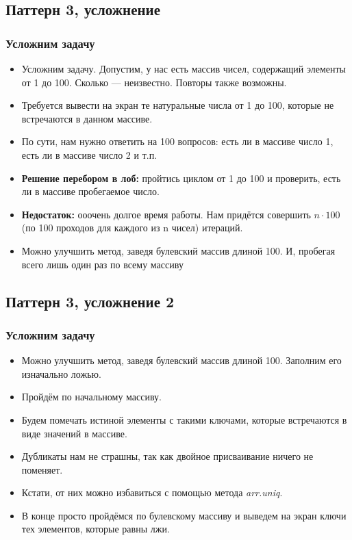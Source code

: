 \documentclass[compress,red]{beamer}
\begin{document}
\subsection{Паттерн 3, усложнение}
\begin{frame}[fragile]
\frametitle{Усложним задачу}
		\begin{itemize}
			\item Усложним задачу. Допустим, у нас есть массив чисел, содержащий элементы от 1 до 100. Сколько --- неизвестно. Повторы также возможны.
			\item Требуется вывести на экран те натуральные числа от 1 до 100, которые не встречаются в данном массиве.
			\item По сути, нам нужно ответить на 100 вопросов: есть ли в массиве число 1, есть ли в массиве число 2 и т.п.
			\item \textbf{Решение перебором в лоб:} пройтись циклом от 1 до 100 и проверить, есть ли в массиве пробегаемое число. 
			\item \textbf{Недостаток:} ооочень долгое время работы. Нам придётся совершить $n\cdot 100$ (по 100 проходов для каждого из n чисел) итераций.
			\item Можно улучшить метод, заведя булевский массив длиной 100. И, пробегая всего лишь один раз по всему массиву
		\end{itemize}
\end{frame}

\subsection{Паттерн 3, усложнение 2}
\begin{frame}[fragile]
\frametitle{Усложним задачу}
		\begin{itemize}
			\item Можно улучшить метод, заведя булевский массив длиной 100. Заполним его изначально ложью. 
			\item Пройдём по начальному массиву.
			\item Будем помечать истиной элементы с такими ключами, которые встречаются в виде значений в массиве.
			\item Дубликаты нам не страшны, так как двойное присваивание ничего не поменяет.
			\item Кстати, от них можно избавиться с помощью метода \emph{arr.uniq}.
			\item В конце просто пройдёмся по булевскому массиву и выведем на экран ключи тех элементов, которые равны лжи.
		\end{itemize}
\end{frame}
\end{document}
